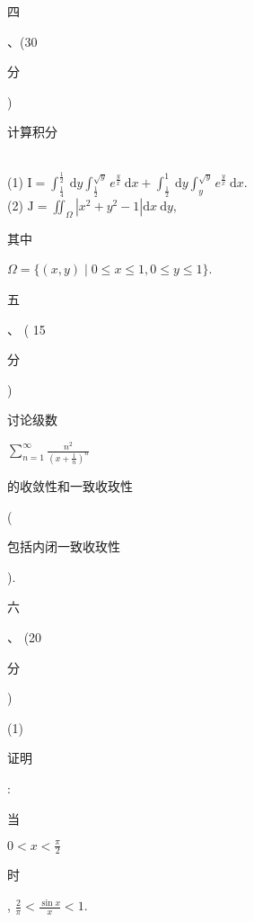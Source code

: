 \documentclass[10pt]{article}
\begin{document}
\begin{CJK}{UTF8}{mj}四\end{CJK}、(30 \begin{CJK}{UTF8}{mj}分\end{CJK}) \begin{CJK}{UTF8}{mj}计算积分\end{CJK}\\
(1) $\mathrm{I}=\int_{\frac{1}{4}}^{\frac{1}{2}} \mathrm{~d} y \int_{\frac{1}{2}}^{\sqrt{y}} e^{\frac{y}{x}} \mathrm{~d} x+\int_{\frac{1}{2}}^{1} \mathrm{~d} y \int_{y}^{\sqrt{y}} e^{\frac{y}{x}} \mathrm{~d} x$.\\
(2) $\mathrm{J}=\iint_{\Omega}\left|x^{2}+y^{2}-1\right| \mathrm{d} x \mathrm{~d} y$, \begin{CJK}{UTF8}{mj}其中\end{CJK} $\Omega=\{(x, y) \mid 0 \leq x \leq 1,0 \leq y \leq 1\}$.

\begin{CJK}{UTF8}{mj}五\end{CJK}、 ( 15 \begin{CJK}{UTF8}{mj}分\end{CJK}) \begin{CJK}{UTF8}{mj}讨论级数\end{CJK} $\sum_{n=1}^{\infty} \frac{n^{2}}{\left(x+\frac{1}{n}\right)^{n}}$ \begin{CJK}{UTF8}{mj}的收敛性和一致收玫性\end{CJK}(\begin{CJK}{UTF8}{mj}包括内闭一致收玫性\end{CJK}).

\begin{CJK}{UTF8}{mj}六\end{CJK}、 (20 \begin{CJK}{UTF8}{mj}分\end{CJK})

(1) \begin{CJK}{UTF8}{mj}证明\end{CJK}: \begin{CJK}{UTF8}{mj}当\end{CJK} $0<x<\frac{\pi}{2}$ \begin{CJK}{UTF8}{mj}时\end{CJK}, $\frac{2}{\pi}<\frac{\sin x}{x}<1$.
\end{document}
